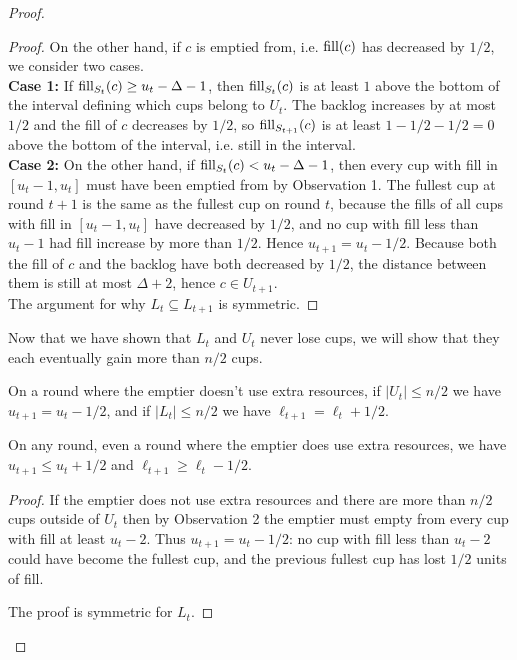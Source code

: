 \begin{proof}
\begin{proof}
    On the other hand, if $c$ is emptied from, i.e. $\operatorname{\textnormal{fill}}(c)$ has decreased by
    $1/2$, we consider two cases.\\
    \textbf{Case 1:} If $\operatorname{\textnormal{fill}}_{S_t}(c) \ge u_t-\Delta -1$, then
    $\operatorname{\textnormal{fill}}_{S_t}(c)$ is at least $1$ above the bottom of the
    interval defining which cups belong to $U_t$. The backlog
    increases by at most $1/2$ and the fill of $c$ decreases by $1/2$, so
    $\operatorname{\textnormal{fill}}_{S_{t+1}}(c)$ is at least $1-1/2-1/2 = 0$ above the bottom of the
    interval, i.e. still in the interval. \\
    \textbf{Case 2:} On the other hand, if $\operatorname{\textnormal{fill}}_{S_t}(c) <
    u_t-\Delta-1$, then every cup with fill in $[u_t-1, u_t]$
    must have been emptied from by Observation 1. The fullest cup
    at round $t+1$ is the same as the fullest cup on round $t$,
    because the fills of all cups with fill in $[u_t-1, u_t]$
    have decreased by $1/2$, and no cup with fill less than
    $u_t-1$ had fill increase by more than $1/2$. Hence $u_{t+1}
    = u_t -1/2$. Because both the fill of $c$ and the backlog
    have both decreased by $1/2$, the distance between them is
    still at most $\Delta+2$, hence $c\in U_{t+1}$.\\
    The argument for why $L_t \subseteq L_{t+1}$ is symmetric.
  \end{proof}

  Now that we have shown that $L_t$ and $U_t$ never lose cups, we will show
  that they each eventually gain more than $n/2$ cups.

  \begin{clm}
    \label{clm:howDoLandUchange}
    On a round where the emptier doesn't use extra resources, if
    $|U_t| \le n/2$ we have $u_{t+1} = u_t -1/2$, and if $|L_t|
    \le n/2$ we have $\ell_{t+1} = \ell_t+ 1/2$.

    On any round, even a round where the emptier does use extra
    resources, we have $u_{t+1} \le u_t + 1/2$ and $\ell_{t+1} \ge \ell_t - 1/2$.
  \end{clm}
  \begin{proof}
    If the emptier does not use extra resources and there are
    more than $n/2$ cups outside of $U_t$ then by
    Observation 2 the emptier must empty from
    every cup with fill at least $u_t-2$. Thus $u_{t+1} = u_t -1/2$: no cup
    with fill less than $u_t-2$ could have become the fullest cup, and the
    previous fullest cup has lost $1/2$ units of fill. 

    The proof is symmetric for $L_t$.


\end{proof}
\end{proof}
